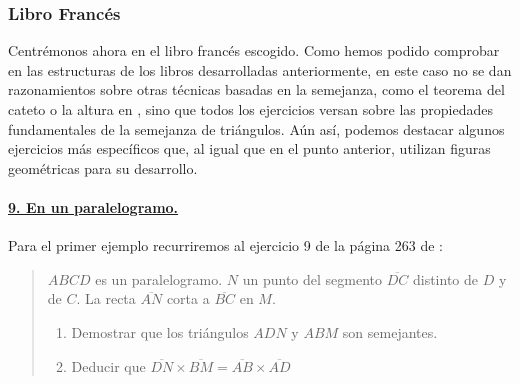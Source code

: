 	
\subsubsection{Libro Francés}	

	Centrémonos ahora en el libro francés escogido. Como hemos podido comprobar en las estructuras de los libros desarrolladas anteriormente, en este caso no se dan razonamientos sobre otras técnicas basadas en la semejanza, como el teorema del cateto o la altura en \citet{spa}, sino que todos los ejercicios versan sobre las propiedades fundamentales de la semejanza de triángulos. Aún así, podemos destacar algunos ejercicios más específicos que, al igual que en el punto anterior, utilizan figuras geométricas para su desarrollo.

	
	\paragraph{\underline{9. En un paralelogramo.}} Para el primer ejemplo recurriremos al ejercicio 9 de la página 263 de \citet{fr}:
	
%		
		\begin{quote}
			$ABCD$ es un paralelogramo. $N$ un punto del segmento $\overline{DC}$ distinto de $D$ y de $C$. La recta $\overline{AN}$ corta a $\overline{BC}$ en $M$.
			\begin{enumerate}
				\item Demostrar que los triángulos $ADN$ y $ABM$ son semejantes.
				\item Deducir que $\overline{DN}\times\overline{BM}=\overline{AB}\times\overline{AD}$
			\end{enumerate}
		\end{quote}

